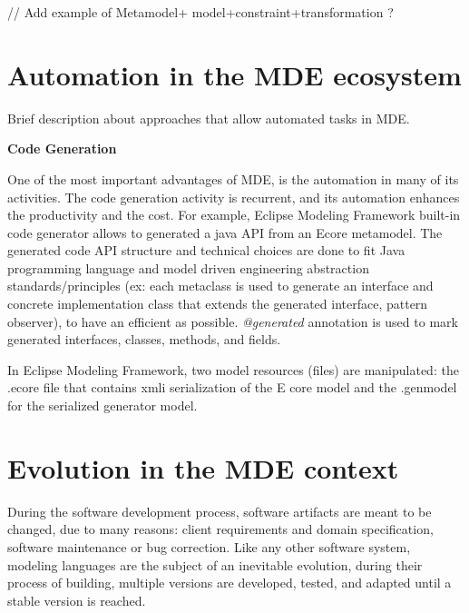 // Add example of Metamodel+ model+constraint+transformation ?

\section{Automation in the MDE ecosystem}

Brief description about approaches that allow automated tasks in MDE.

\textbf{Code Generation}

One of the most important advantages of MDE, is the automation in many of its activities. The code generation activity is recurrent, and its automation enhances the productivity and the cost.
For example, Eclipse Modeling Framework built-in code generator allows to generated a java API from an Ecore metamodel. The generated code API structure and technical choices are done to fit Java programming language and model driven engineering abstraction standards/principles (ex: each metaclass is used to generate an interface and concrete implementation class that extends the generated interface, pattern observer), to have an efficient as possible.
\textit{@generated} annotation is used to mark generated interfaces, classes, methods, and fields.

In Eclipse Modeling Framework, two model resources (files) are manipulated: the .ecore file that contains  xmli serialization of the E
core model and the .genmodel for the serialized generator model.

\section{Evolution in the MDE context}

During the software development process, software artifacts are meant to be changed, due to many reasons: client requirements and domain specification, software maintenance or bug correction. Like any other software system, modeling languages are the subject of an inevitable evolution, during their process of building, multiple versions are developed, tested, and adapted until a stable version is reached. 

